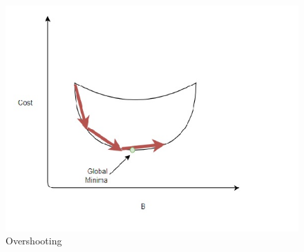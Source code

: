 \documentclass[12pt]{article}
\begin{document}
\begin{figure}[H]
\centering
\includegraphics[scale=0.60]{./Images/Pasted image 20230915222826.png}
\caption{Overshooting}
\label{Overshooting}
\end{figure}
\end{document}
